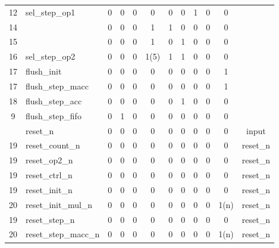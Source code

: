 \documentclass[mscthesis]{usiinfthesis}
\begin{document}
\begin{table}
\begin{center}
\begin{tabular}{|c|l|*{10}{c|}}
    12   & sel\_step\_op1              & 0    & 0      & 0    & 0          & 0      & 0      & 1    & 0    & 0     &             \\
    14   &                             & 0    & 0      & 0    & 1          & 1      & 0      & 0    & 0    & 0     &             \\
    15   &                             & 0    & 0      & 0    & 1          & 0      & 1      & 0    & 0    & 0     &             \\
    16   & sel\_step\_op2              & 0    & 0      & 0    & 1(5)       & 1      & 1      & 0    & 0    & 0     &             \\
    17   & flush\_init                 & 0    & 0      & 0    & 0          & 0      & 0      & 0    & 0    & 1     &             \\
    17   & flush\_step\_macc           & 0    & 0      & 0    & 0          & 0      & 0      & 0    & 0    & 1     &             \\
    18   & flush\_step\_acc            & 0    & 0      & 0    & 0          & 0      & 1      & 0    & 0    & 0     &             \\
    9    & flush\_step\_fifo           & 0    & 1      & 0    & 0          & 0      & 0      & 0    & 0    & 0     &             \\
         & reset\_n                    & 0    & 0      & 0    & 0          & 0      & 0      & 0    & 0    & 0     & input       \\
    19   & reset\_count\_n             & 0    & 0      & 0    & 0          & 0      & 0      & 0    & 0    & 0     & reset\_n    \\
    19   & reset\_op2\_n               & 0    & 0      & 0    & 0          & 0      & 0      & 0    & 0    & 0     & reset\_n    \\
    19   & reset\_ctrl\_n              & 0    & 0      & 0    & 0          & 0      & 0      & 0    & 0    & 0     & reset\_n    \\
    19   & reset\_init\_n              & 0    & 0      & 0    & 0          & 0      & 0      & 0    & 0    & 0     & reset\_n    \\
    20   & reset\_init\_mul\_n         & 0    & 0      & 0    & 0          & 0      & 0      & 0    & 0    & 1(n)  & reset\_n    \\
    19   & reset\_step\_n              & 0    & 0      & 0    & 0          & 0      & 0      & 0    & 0    & 0     & reset\_n    \\
    20   & reset\_step\_macc\_n        & 0    & 0      & 0    & 0          & 0      & 0      & 0    & 0    & 1(n)  & reset\_n    \\

\end{tabular}
\end{center}
\end{table}
\end{document}
